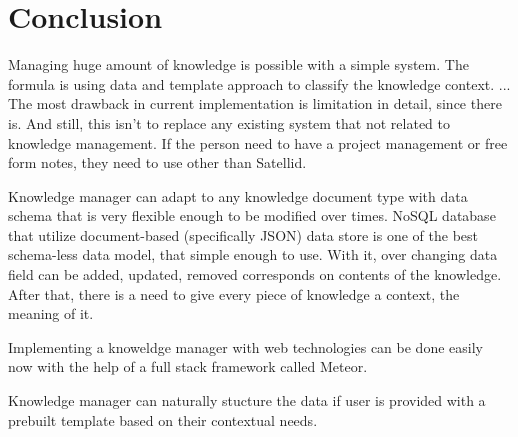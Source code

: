 \section{Conclusion}
\label{sec:conclusion}

Managing huge amount of knowledge is possible with a simple system.
The formula is using data and template approach to classify the knowledge context.
...
The most drawback in current implementation is limitation in detail, since there is.
And still, this isn't to replace any existing system that not related to knowledge management.
If the person need to have a project management or free form notes, they need to use other than Satellid.

Knowledge manager can adapt to any knowledge document type with data schema that is very flexible enough to be modified over times.
\ac{NoSQL} database that utilize document-based (specifically \ac{JSON}) data store is one of the best schema-less data model, that simple enough to use.
With it, over changing data field can be added, updated, removed corresponds on contents of the knowledge.
After that, there is a need to give every piece of knowledge a context, the meaning of it.

Implementing a knoweldge manager with web technologies can be done easily now with the help of a full stack framework called Meteor.

Knowledge manager can naturally stucture the data if user is provided with a prebuilt template based on their contextual needs.
